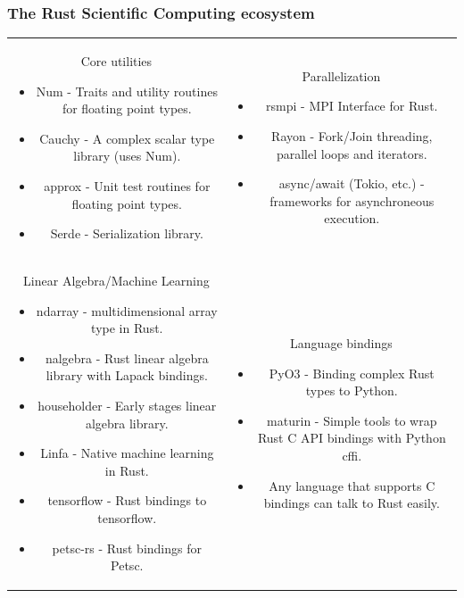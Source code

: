 \documentclass[dvipsnames,10pt]{beamer}
\begin{document}
\begin{frame}
\frametitle{The Rust Scientific Computing ecosystem}

{\tiny

\begin{tabular}{cc}
\begin{minipage}[t]{5cm}
{\color{blue} Core utilities}
\begin{itemize}
\item Num - Traits and utility routines for floating point types.
\item Cauchy - A complex scalar type library (uses Num).
\item approx - Unit test routines for floating point types.
\item Serde - Serialization library.
\end{itemize}
\end{minipage} & 
\begin{minipage}[t]{5cm}
{\color{blue}Parallelization}
\begin{itemize}
\item rsmpi - MPI Interface for Rust.
\item Rayon - Fork/Join threading, parallel loops and iterators.
\item async/await (Tokio, etc.) - frameworks for asynchroneous execution.
\end{itemize}
\end{minipage}\\
\begin{minipage}[t]{5cm}
{\color{blue} Linear Algebra/Machine Learning}
\begin{itemize}
\item ndarray - multidimensional array type in Rust.
\item nalgebra - Rust linear algebra library with Lapack bindings.
\item householder - Early stages linear algebra library.
\item Linfa - Native machine learning in Rust.
\item tensorflow - Rust bindings to tensorflow.
\item petsc-rs - Rust bindings for Petsc.
\end{itemize}
\end{minipage} &
\begin{minipage}[t]{5cm}
{\color{blue} Language bindings}
\begin{itemize}
\item PyO3 - Binding complex Rust types to Python.
\item maturin - Simple tools to wrap Rust C API bindings with Python cffi.
\item Any language that supports C bindings can talk to Rust easily.
\end{itemize}
\end{minipage}


\end{tabular}}
\end{frame}
\end{document}
